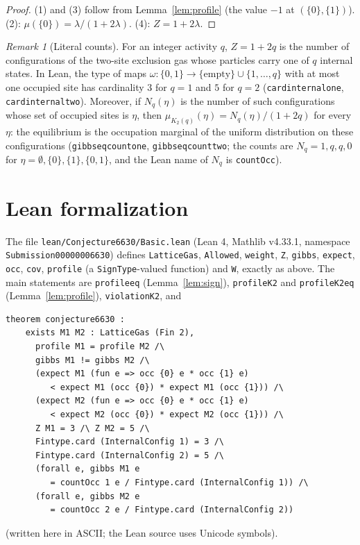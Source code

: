 \documentclass[11pt]{article}
\theoremstyle{definition}
\theoremstyle{remark}
\newtheorem{remark}[theorem]{Remark}
\renewcommand{\_}{\oldus\allowbreak}
\begin{document}
\begin{proof}
(1) and (3) follow from Lemma~\ref{lem:profile} (the value $-1$ at $(\{0\},\{1\})$). (2):
$\mu(\{0\})=\lambda/(1+2\lambda)$. (4): $Z=1+2\lambda$.
\end{proof}

\begin{remark}[Literal counts]
For an integer activity $q$, $Z=1+2q$ is the number of configurations of the two-site exclusion
gas whose particles carry one of $q$ internal states. In Lean, the type of maps
$\omega:\{0,1\}\to\{\text{empty}\}\cup\{1,\dots,q\}$ with at most one occupied site has
cardinality $3$ for $q=1$ and $5$ for $q=2$ (\texttt{card\_internal\_one},
\texttt{card\_internal\_two}). Moreover, if $N_q(\eta)$ is the number of such configurations whose
set of occupied sites is $\eta$, then $\mu_{K_2(q)}(\eta)=N_q(\eta)/(1+2q)$ for every $\eta$: the
equilibrium is the occupation marginal of the uniform distribution on these configurations
(\texttt{gibbs\_eq\_count\_one}, \texttt{gibbs\_eq\_count\_two}; the counts are $N_q=1,q,q,0$ for
$\eta=\emptyset,\{0\},\{1\},\{0,1\}$, and the Lean name of $N_q$ is \texttt{countOcc}).
\end{remark}

\section{Lean formalization}

The file \texttt{lean/Conjecture6630/Basic.lean} (Lean 4, Mathlib v4.33.1, namespace
\texttt{Submission00000006630}) defines \texttt{LatticeGas}, \texttt{Allowed}, \texttt{weight},
\texttt{Z}, \texttt{gibbs}, \texttt{expect}, \texttt{occ}, \texttt{cov}, \texttt{profile} (a
\texttt{SignType}-valued function) and \texttt{W}, exactly as above. The main statements are
\texttt{profile\_eq} (Lemma~\ref{lem:sign}), \texttt{profile\_K2} and \texttt{profile\_K2\_eq}
(Lemma~\ref{lem:profile}), \texttt{violation\_K2}, and
\begin{verbatim}
theorem conjecture6630 :
    exists M1 M2 : LatticeGas (Fin 2),
      profile M1 = profile M2 /\
      gibbs M1 != gibbs M2 /\
      (expect M1 (fun e => occ {0} e * occ {1} e)
         < expect M1 (occ {0}) * expect M1 (occ {1})) /\
      (expect M2 (fun e => occ {0} e * occ {1} e)
         < expect M2 (occ {0}) * expect M2 (occ {1})) /\
      Z M1 = 3 /\ Z M2 = 5 /\
      Fintype.card (InternalConfig 1) = 3 /\
      Fintype.card (InternalConfig 2) = 5 /\
      (forall e, gibbs M1 e
         = countOcc 1 e / Fintype.card (InternalConfig 1)) /\
      (forall e, gibbs M2 e
         = countOcc 2 e / Fintype.card (InternalConfig 2))
\end{verbatim}
(written here in ASCII; the Lean source uses Unicode symbols).
\end{document}
